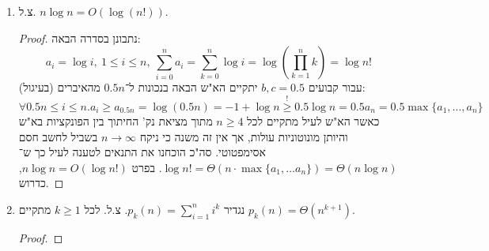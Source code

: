 \documentclass[]{article}
\newcommand\N     {\mathbb{N}}
\newcommand\other {\text{else}}
\newcommand\logn  {\log n}
\newcommand\sge   {\overset{!}{\ge}}
\renewcommand\inf {\infty}
\newcommand\sumnk     {\sum_{k = 0}^{n}}
\newcommand\cl [1]    {\left ( #1 \right )}
\begin{document}
\begin{enumerate}[A)]
\begin{enumerate}[1.]
			\begin{proof}
				תהה $a_1, a_2, \dots$ סדרה של מספרים. יהי $n \in \N$. נניח קיום קבוע $b, c \in \N$ כך ש־$b \cdot n$ מאיברי הסדרה הם בגודל של לפחות $c \cdot \max\{a_1, \dots a_n\}$. בפרט, הסדרה $a_1, \dots, a_n$ תקיים את התנאי הזה. ידוע: 
				\[ \underbrace{cb }_{\mathclap{const.}}\cdot \; n \max\{a_1, \dots, a_n\} \le \sum_{i = 1}^{n} \begin{cases}
					a_i & a_i = c\max\{a_1, \dots a_n\} \\
					0 & \other
				\end{cases} \le \bm{\sum_{i = 1}^{n} a_i} \le \sum_{i = 1}^{n}\max\{a_1, \dots a_n\} = n \cdot \max\{a_1, \dots a_n\} \]
			\end{proof}
			סה"כ $\sum_{i = 1}^{n} a_i = \Theta(n \cdot \max\{a_1, \dots, a_n\})$ מהגדרת החסם כדרוש. 
		\item צ.ל. $n \logn = O(\log(n!))$. 
		\begin{proof}
			נתבונן בסדרה הבאה: 
			\[ a_i = \log i, \ 1 \le i \le n, \ \sum_{i = 0}^{n}a_i = \sumnk\log i = \log\cl{\prod_{k = 1}^{n}k} = \logn! \]
			עבור קבועים $b, c = 0.5$ יתקיים הא"ש הבאה בנכונות ל־$0.5n$ מהאיברים (בעיגול): 
			\[ \forall 0.5n \le i \le n. a_i \ge a_{0.5n} = \log(0.5n) = -1 + \log n \sge 0.5\logn = 0.5a_n = 0.5\max\{a_1, \dots, a_n\} \]
			כאשר הא"ש לעיל מתקיים לכל $n \ge 4$ מתוך מציאת נק' החיתוך בין הפונקציות בא"ש והיותן מונוטוניות עולות, אך אין זה משנה כי ניקח $n \to \inf$ בשביל לחשב חסם אסימפטוטי. סה"כ הוכחנו את התנאים לטענה לעיל כך ש־$\logn! = \Theta(n \cdot \max\{a_1, \dots a_n\}) = \Theta(n\logn)$. בפרט $n\logn = O(\logn!)$, כדרוש. 			
		\end{proof}
		\item נגדיר $p_k(n) = \sum_{i = 1}^{n}i^k$. צ.ל. לכל $k \ge 1$ מתקיים $p_k(n) = \Theta(n^{k + 1})$. 
		
		\begin{proof}
			

\end{proof}
\end{enumerate}
\end{enumerate}
\end{document}

